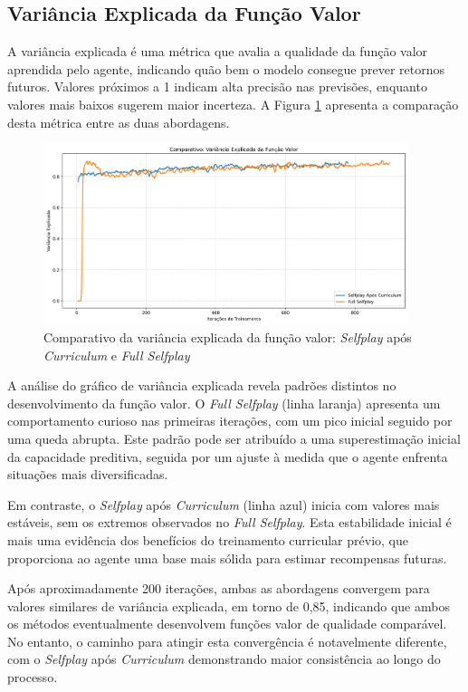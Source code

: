 \subsection{Variância Explicada da Função Valor}

A variância explicada é uma métrica que avalia a qualidade da função valor aprendida pelo agente, indicando quão bem o modelo consegue prever retornos futuros. Valores próximos a 1 indicam alta precisão nas previsões, enquanto valores mais baixos sugerem maior incerteza. A Figura \ref{fig:explained_variance} apresenta a comparação desta métrica entre as duas abordagens.

\begin{figure}[H]
    \centering
    \includegraphics[width=0.95\textwidth]{fig/graficos_trabalho/graficos_experimentos/geral/comparativo_variancia_explicada.png}
    \caption{Comparativo da variância explicada da função valor: \textit{Selfplay} após \textit{Curriculum} e \textit{Full Selfplay}}
    \label{fig:explained_variance}
\end{figure}

A análise do gráfico de variância explicada revela padrões distintos no desenvolvimento da função valor. O \textit{Full Selfplay} (linha laranja) apresenta um comportamento curioso nas primeiras iterações, com um pico inicial seguido por uma queda abrupta. Este padrão pode ser atribuído a uma superestimação inicial da capacidade preditiva, seguida por um ajuste à medida que o agente enfrenta situações mais diversificadas.

Em contraste, o \textit{Selfplay} após \textit{Curriculum} (linha azul) inicia com valores mais estáveis, sem os extremos observados no \textit{Full Selfplay}. Esta estabilidade inicial é mais uma evidência dos benefícios do treinamento curricular prévio, que proporciona ao agente uma base mais sólida para estimar recompensas futuras.

Após aproximadamente 200 iterações, ambas as abordagens convergem para valores similares de variância explicada, em torno de 0,85, indicando que ambos os métodos eventualmente desenvolvem funções valor de qualidade comparável. No entanto, o caminho para atingir esta convergência é notavelmente diferente, com o \textit{Selfplay} após \textit{Curriculum} demonstrando maior consistência ao longo do processo.


